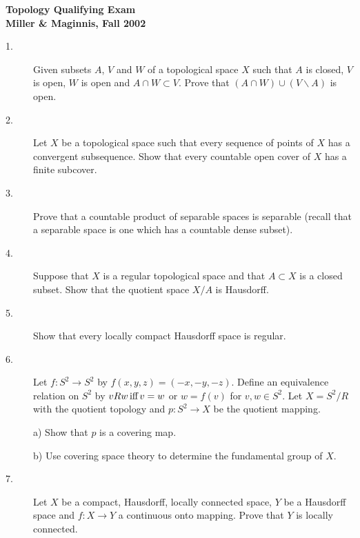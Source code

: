 \documentclass[12pt]{article}
\def\iff{ {\hbox{\,iff\,}} }
\begin{document}
\begin{large}

\begin{center}
{\bf
Topology Qualifying Exam\\
Miller \& Maginnis, Fall 2002
}\end{center}

\vspace{.15in}


\begin{description}

\item[1.]
Given subsets $A$, $V$ and $W$ of a topological space $X$ such that
$A$ is closed, $V$ is open, $W$ is open and $A\cap W\subset V$.
Prove that $(A\cap W) \cup(V\backslash A)$ is open.

\vspace{.15in}
\item[2.]
Let $X$ be a topological space such that every sequence of points of
$X$ has a convergent subsequence. Show that every countable open
cover of $X$ has a finite subcover.

\vspace{.15in}
\item[3.]
Prove that a countable product of separable  spaces is separable
(recall that a separable space is one which has a countable dense subset).

\item[4.]
Suppose that $X$ is a regular topological space and that $A\subset X$ is a
closed subset. Show that the quotient space $X/A$ is  Hausdorff.

\vspace{.15in}
\item[5.]
Show that every locally compact Hausdorff space is regular.

\vspace{.15in}
\item[6.]
Let $f:S^2\to S^2$ by $f(x,y,z)=(-x,-y,-z)$.
Define an equivalence relation on
$S^2$ by $vRw \iff v=w$ or $w=f(v)$ for $v,w\in S^2$.
Let $X=S^2/R$ with the quotient topology and $p:S^2\to X$
be the quotient mapping.

\item[\quad ]a)
Show that $p$ is a covering map.

\item[\quad] b)
Use covering space theory to determine the fundamental group of $X$.

\vspace{.15in}
\item[7.]
Let $X$ be a compact, Hausdorff, locally connected space, $Y$ be a
Hausdorff space and $f:X\to Y$ a continuous onto mapping.
Prove that $Y$ is locally connected.

\end{description}
\end{large}
\end{document}
